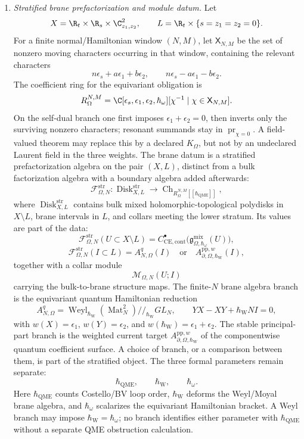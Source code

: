 \begin{enumerate}
  \item \emph{Stratified brane prefactorization and module datum.}
  Let
  \[
    X=\R_t\times\R_s\times\C^2_{z_1,z_2},\qquad
    L=\R_t\times\{s=z_1=z_2=0\}.
  \]
  For a finite normal/Hamiltonian window \((N,M)\), let
  \(\mathsf X_{N,M}\) be the set of nonzero moving characters occurring
  in that window, containing the relevant characters
  \[
    n\epsilon_s+a\epsilon_1+b\epsilon_2,\qquad
    n\epsilon_s-a\epsilon_1-b\epsilon_2 .
  \]
  The coefficient ring for the equivariant obligation is
  \[
    R_\Omega^{N,M}
    =
    \C[\epsilon_s,\epsilon_1,\epsilon_2,\hbar_\omega]
    [\chi^{-1}\mid \chi\in\mathsf X_{N,M}].
  \]
  On the self-dual branch one first imposes
  \(\epsilon_1+\epsilon_2=0\), then inverts only the surviving nonzero
  characters; resonant summands stay in \(\operatorname{pr}_{\chi=0}\).
  A field-valued theorem may replace this by a declared \(K_\Omega\), but
  not by an undeclared Laurent field in the three weights.
  The brane datum is a stratified prefactorization algebra on the
  pair \((X,L)\), distinct from a bulk factorization algebra with a
  boundary algebra added afterwards:
  \[
    \mathcal F^{\mathrm{str}}_{\Omega,N}\colon
    \operatorname{Disk}^{\mathrm{str}}_{X,L}
      \longrightarrow
    \operatorname{Ch}_{R_\Omega^{N,M}[[\hbar_{\mathrm{QME}}]]},
  \]
  where \(\operatorname{Disk}^{\mathrm{str}}_{X,L}\) contains bulk
  mixed holomorphic-topological polydisks in \(X\setminus L\), brane intervals
  in \(L\), and collars meeting the lower stratum.  Its values are part
  of the data:
  \[
    \mathcal F^{\mathrm{str}}_{\Omega,N}(U\subset X\setminus L)
    =
    C^\bullet_{\mathrm{CE},\mathrm{cont}}
    \bigl(\mathfrak g^{\mathrm{mix}}_{\Omega,\hbar_\omega}(U)\bigr),
  \]
  \[
    \mathcal F^{\mathrm{str}}_{\Omega,N}(I\subset L)
    =
    A^q_{N,\Omega}(I)
    \quad\text{or}\quad
    A^{\mathrm{pp},w}_{\partial,\Omega,\hbar_{\mathrm{W}}}(I),
  \]
  together with a collar module
  \[
    \mathcal M_{\Omega,N}(U;I)
  \]
  carrying the bulk-to-brane structure maps.  The finite-\(N\) brane
  algebra branch is the equivariant quantum Hamiltonian reduction
  \[
    A^q_{N,\Omega}
    =
    \operatorname{Weyl}_{\hbar_{\mathrm{W}}}(\operatorname{Mat}_N^2)
    //_{\hbar_{\mathrm{W}}} GL_N,
    \qquad
    YX-XY+\hbar_{\mathrm{W}}N I=0,
  \]
  with \(w(X)=\epsilon_1\), \(w(Y)=\epsilon_2\), and
  \(w(\hbar_{\mathrm{W}})=\epsilon_1+\epsilon_2\).  The stable
  principal-part branch is the weighted current target
  \(A^{\mathrm{pp},w}_{\partial,\Omega,\hbar_{\mathrm{W}}}\) of the
  componentwise quantum coefficient surface.  A choice of branch, or a
  comparison between them, is part of the stratified object.  The
  three formal parameters remain separate:
  \[
    \hbar_{\mathrm{QME}},\qquad
    \hbar_{\mathrm{W}},\qquad
    \hbar_\omega .
  \]
  Here \(\hbar_{\mathrm{QME}}\) counts Costello/BV loop order,
  \(\hbar_{\mathrm{W}}\) deforms the Weyl/Moyal brane algebra, and
  \(\hbar_\omega\) scalarizes the equivariant Hamiltonian bracket.  A
  Weyl branch may impose \(\hbar_{\mathrm{W}}=\hbar_\omega\); no branch
  identifies either parameter with \(\hbar_{\mathrm{QME}}\) without a
  separate QME obstruction calculation.


\end{enumerate}
